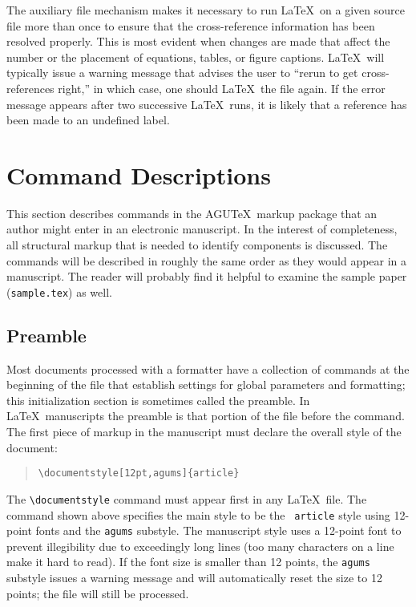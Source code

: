 The auxiliary file mechanism makes it necessary to run \LaTeX\ on 
a given source file more than once to ensure that the cross-reference 
information has been resolved properly.  This is most evident when 
changes are made that affect the number or the placement of equations, 
tables, or figure captions.  \LaTeX\ will typically issue a warning 
message that advises the user to ``rerun to get cross-references 
right,'' in which case, one should \LaTeX\ the file again.  If the
error message appears after two successive \LaTeX\ runs, it is likely 
that a reference has been made to an undefined label.

\section{Command Descriptions}

This section describes commands in the AGU\TeX\ markup package 
that an author might enter in an electronic manuscript.  In the 
interest of completeness, all structural markup that is needed to 
identify components is discussed.  The commands will be described 
in roughly the same order as they would appear in a manuscript.  
The reader will probably find it helpful to examine the sample 
paper (\verb"sample.tex") as well. 

\subsection{Preamble}

Most documents processed with a formatter have a collection of commands 
at the beginning of the file that establish settings for global parameters 
and formatting; this initialization section is sometimes called the preamble.  
In \LaTeX\ manuscripts the preamble is that portion of the file before the 
\verb"" command.
\clearpage
The first piece of markup in the manuscript must 
declare the overall style of the document:
\begin{center}
\begin{quote}
\verb"\documentstyle[12pt,agums]{article}"
\end{quote}
\end{center}
The \verb"\documentstyle" command must appear first in any \LaTeX\ 
file.  The command shown above specifies the main style to be the {\tt 
article} style using 12-point fonts and the {\tt agums} substyle.  
The manuscript style uses a 12-point font to prevent illegibility 
due to exceedingly long lines (too many characters on a line make 
it hard to read).  If the font size is smaller than 12 points, the 
{\tt agums} substyle issues a warning message and will automatically 
reset the size to 12 points; the file will still be processed.

